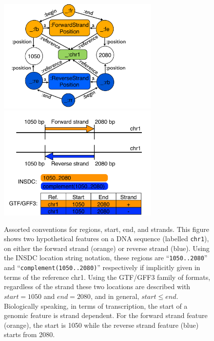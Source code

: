 \begin{figure}
\begin{center}
\includegraphics[width=8cm]{figures/figures3.pdf}
\includegraphics[width=8cm]{figures/figures.pdf}
\end{center}
\caption{Assorted conventions for regions, start, end, and strands.
This figure shows two hypothetical features on a DNA sequence
(labelled \texttt{chr1}), on either the forward strand (orange) or
reverse strand (blue).
Using the INSDC location string notation, these regions are
``\texttt{1050..2080}'' and ``\texttt{complement(1050..2080)}''
respectively if implicitly given in terms of the reference chr1.
Using the GTF/GFF3 family of formats, regardless of the
strand these two locations are described with $start = 1050$
and $end = 2080$, and in general, $start \leq end$.
Biologically speaking, in terms of transcription, the start of a genomic
feature is strand dependent.
For the forward strand feature (orange), the start is 1050
while the reverse strand feature (blue) starts from 2080.}
\label{fig:strands}
\end{figure}

